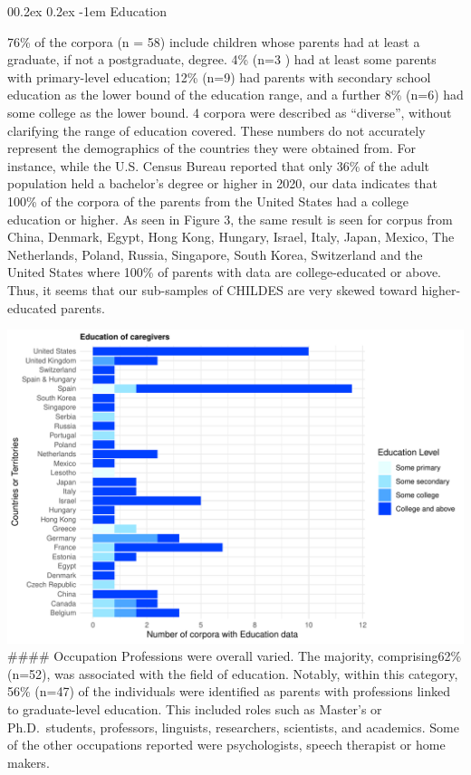 \documentclass[
  man,floatsintext]{apa6}
\makeatletter
\let\oldparagraph\paragraph
\renewcommand{\paragraph}[1]{\oldparagraph{#1}\mbox{}}
\renewcommand{\paragraph}{\@startsection{paragraph}{4}{\parindent}%
  {0\baselineskip \@plus 0.2ex \@minus 0.2ex}%
  {-1em}%
  {\normalfont\normalsize\bfseries\itshape\typesectitle}}
\makeatother
\begin{document}
\hypertarget{education}{%
\paragraph{Education}\label{education}}

76\% of the corpora (n = 58) include children whose parents had at least a graduate, if not a postgraduate, degree. 4\% (n=3 ) had at least some parents with primary-level education; 12\% (n=9) had parents with secondary school education as the lower bound of the education range, and a further 8\% (n=6) had some college as the lower bound. 4 corpora were described as ``diverse'', without clarifying the range of education covered. These numbers do not accurately represent the demographics of the countries they were obtained from. For instance, while the U.S. Census Bureau reported that only 36\% of the adult population held a bachelor's degree or higher in 2020, our data indicates that 100\% of the corpora of the parents from the United States had a college education or higher. As seen in Figure 3, the same result is seen for corpus from China, Denmark, Egypt, Hong Kong, Hungary, Israel, Italy, Japan, Mexico, The Netherlands, Poland, Russia, Singapore, South Korea, Switzerland and the United States where 100\% of parents with data are college-educated or above. Thus, it seems that our sub-samples of CHILDES are very skewed toward higher-educated parents.

\includegraphics{CHILDES_short_files/figure-latex/figure3 -1.pdf}
\#\#\#\# Occupation
Professions were overall varied. The majority, comprising62\% (n=52), was associated with the field of education. Notably, within this category, 56\% (n=47) of the individuals were identified as parents with professions linked to graduate-level education. This included roles such as Master's or Ph.D.~students, professors, linguists, researchers, scientists, and academics. Some of the other occupations reported were psychologists, speech therapist or home makers.
\end{document}
